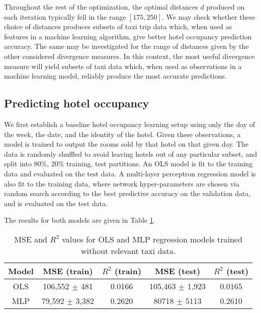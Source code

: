 \documentclass[useAMS, usenatbib]{biom}
\begin{document}
Throughout the rest of the optimization, the optimal distances $d$ produced on each iteration typically fell in the range $[175, 250]$. We may check whether these choice of distances produces subsets of taxi trip data which, when used as features in a machine learning algorithm, give better hotel occupancy prediction accuracy. The same may be investigated for the range of distances given by the other considered divergence measures. In this context, the most useful divergence measure will yield subsets of taxi data which, when used as observations in a machine learning model, reliably produce the most accurate predictions.

\subsection{Predicting hotel occupancy}
\label{ss:predicting}

We first establish a baseline hotel occupancy learning setup using only the day of the week, the date, and the identity of the hotel. Given these observations, a model is trained to output the rooms sold by that hotel on that given day. The data is randomly shuffled to avoid leaving hotels out of any particular subset, and split into 80\%, 20\% training, test partitions. An OLS model is fit to the training data and evaluated on the test data. A multi-layer perceptron regression model is also fit to the training data, where network hyper-parameters are chosen via random search according to the best predictive accuracy on the validation data, and is evaluated on the test data.

The results for both models are given in Table \ref{t:baseline_performance}.

\begin{table}
\caption{MSE and $R^2$ values for OLS and MLP regression models trained without relevant taxi data.}
\label{t:baseline_performance}
\begin{center}
\resizebox{\columnwidth}{!}
{
 \begin{tabular}{||c|c|c|c|c||}
 \hline
 Model & MSE (train) & $R^2$ (train) & MSE (test) & $R^2$ (test) \\
 \hline
 OLS & 106,552 $\pm$ 481 & 0.0166 & 105,463 $\pm$ 1,923 & 0.0165 \\
 MLP & 79,592 $\pm$ 3,382 & 0.2620 & 80718 $\pm$ 5113 & 0.2610 \\
 \hline
\end{tabular}
}
\end{center}
\end{table}
\end{document}
